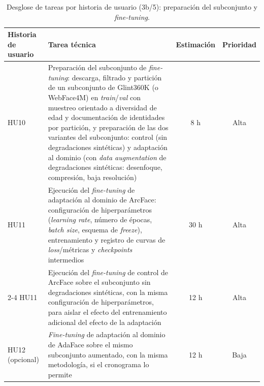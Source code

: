 \documentclass[
  11pt, %
]{charter}
\begin{document}
\begin{table}[htpb]
  \centering
  \small
  \renewcommand{\arraystretch}{0.9}
  \caption{Desglose de tareas por historia de usuario (3b/5): preparación del subconjunto y \textit{fine-tuning}.}
  \begin{tabularx}{\linewidth}{@{}|X|X|c|c|@{}}
    \hline
    \rowcolor[HTML]{C0C0C0}
    Historia de usuario & Tarea técnica & Estimación & Prioridad \\ \hline

    HU10 & Preparación del subconjunto de \textit{fine-tuning}: descarga, filtrado y partición de un subconjunto de Glint360K (o WebFace4M) en \textit{train}/\textit{val} con muestreo orientado a diversidad de edad y documentación de identidades por partición, y preparación de las dos variantes del subconjunto: control (sin degradaciones sintéticas) y adaptación al dominio (con \textit{data augmentation} de degradaciones sintéticas: desenfoque, compresión, baja resolución) & 8 h & Alta \\ \hline

    HU11 & Ejecución del \textit{fine-tuning} de adaptación al dominio de ArcFace: configuración de hiperparámetros (\textit{learning rate}, número de épocas, \textit{batch size}, esquema de \textit{freeze}), entrenamiento y registro de curvas de \textit{loss}/métricas y \textit{checkpoints} intermedios & 30 h & Alta \\ \cline{2-4}
    HU11 & Ejecución del \textit{fine-tuning} de control de ArcFace sobre el subconjunto sin degradaciones sintéticas, con la misma configuración de hiperparámetros, para aislar el efecto del entrenamiento adicional del efecto de la adaptación & 12 h & Alta \\ \hline

    HU12 (opcional) & \textit{Fine-tuning} de adaptación al dominio de AdaFace sobre el mismo subconjunto aumentado, con la misma metodología, si el cronograma lo permite & 12 h & Baja \\ \hline

  \end{tabularx}
\end{table}
\end{document}
